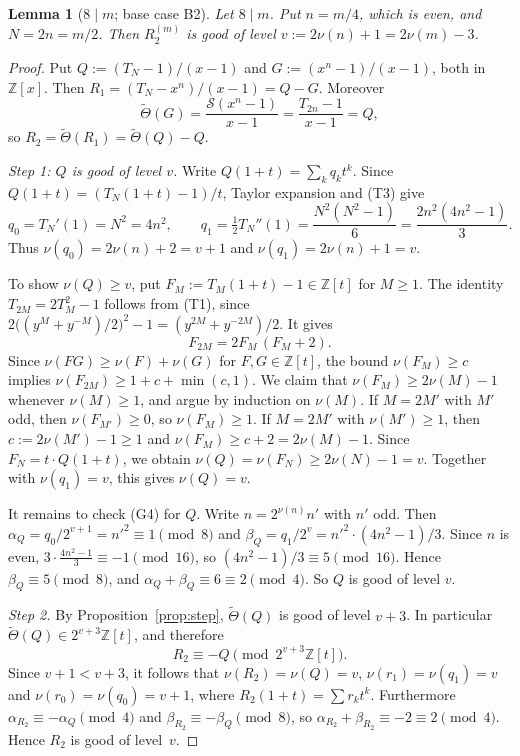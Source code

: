 \documentclass[11pt]{amsart}
\newtheorem{lemma}[theorem]{Lemma}
\theoremstyle{definition}
\theoremstyle{remark}
\newcommand{\Z}{\mathbb{Z}}
\newcommand{\Sop}{\mathcal{S}}
\newcommand{\Th}{\widetilde{\Theta}}
\begin{document}
\begin{lemma}[$8\mid m$; base case B2]\label{lem:base8}
Let $8\mid m$. Put $n=m/4$, which is even, and $N=2n=m/2$. Then $R^{(m)}_2$ is good of level $v:=2\nu(n)+1=2\nu(m)-3$.
\end{lemma}
\begin{proof}
Put $Q:=(T_N-1)/(x-1)$ and $G:=(x^n-1)/(x-1)$, both in $\Z[x]$. Then $R_1=(T_N-x^n)/(x-1)=Q-G$. Moreover
\[
  \Th(G)=\frac{\Sop(x^n-1)}{x-1}=\frac{T_{2n}-1}{x-1}=Q,
\]
so $R_2=\Th(R_1)=\Th(Q)-Q$.

\emph{Step 1: $Q$ is good of level $v$.} Write $Q(1+t)=\sum_kq_kt^k$. Since $Q(1+t)=(T_N(1+t)-1)/t$, Taylor expansion and (T3) give
\[
  q_0=T_N'(1)=N^2=4n^2,\qquad q_1=\tfrac12T_N''(1)=\frac{N^2(N^2-1)}6=\frac{2n^2(4n^2-1)}3 .
\]
Thus $\nu(q_0)=2\nu(n)+2=v+1$ and $\nu(q_1)=2\nu(n)+1=v$.

To show $\nu(Q)\ge v$, put $F_M:=T_M(1+t)-1\in\Z[t]$ for $M\ge1$. The identity $T_{2M}=2T_M^2-1$ follows from (T1), since $2\big((y^M+y^{-M})/2\big)^2-1=(y^{2M}+y^{-2M})/2$. It gives
\[
  F_{2M}=2F_M\,(F_M+2).
\]
Since $\nu(FG)\ge\nu(F)+\nu(G)$ for $F,G\in\Z[t]$, the bound $\nu(F_M)\ge c$ implies $\nu(F_{2M})\ge 1+c+\min(c,1)$. We claim that $\nu(F_M)\ge2\nu(M)-1$ whenever $\nu(M)\ge1$, and argue by induction on $\nu(M)$. If $M=2M'$ with $M'$ odd, then $\nu(F_{M'})\ge0$, so $\nu(F_M)\ge1$. If $M=2M'$ with $\nu(M')\ge1$, then $c:=2\nu(M')-1\ge1$ and $\nu(F_M)\ge c+2=2\nu(M)-1$. Since $F_N=t\cdot Q(1+t)$, we obtain $\nu(Q)=\nu(F_N)\ge 2\nu(N)-1=v$. Together with $\nu(q_1)=v$, this gives $\nu(Q)=v$.

It remains to check (G4) for $Q$. Write $n=2^{\nu(n)}n'$ with $n'$ odd. Then $\alpha_Q=q_0/2^{v+1}=n'^2\equiv1\pmod 8$ and $\beta_Q=q_1/2^{v}=n'^2\cdot(4n^2-1)/3$. Since $n$ is even, $3\cdot\frac{4n^2-1}{3}\equiv-1\pmod{16}$, so $(4n^2-1)/3\equiv5\pmod{16}$. Hence $\beta_Q\equiv5\pmod8$, and $\alpha_Q+\beta_Q\equiv6\equiv2\pmod4$. So $Q$ is good of level $v$.

\emph{Step 2.} By Proposition~\ref{prop:step}, $\Th(Q)$ is good of level $v+3$. In particular $\Th(Q)\in2^{v+3}\Z[t]$, and therefore
\[
  R_2\equiv -Q\pmod{2^{v+3}\Z[t]} .
\]
Since $v+1<v+3$, it follows that $\nu(R_2)=\nu(Q)=v$, $\nu(r_1)=\nu(q_1)=v$ and $\nu(r_0)=\nu(q_0)=v+1$, where $R_2(1+t)=\sum r_kt^k$. Furthermore $\alpha_{R_2}\equiv-\alpha_Q\pmod4$ and $\beta_{R_2}\equiv-\beta_Q\pmod 8$, so $\alpha_{R_2}+\beta_{R_2}\equiv-2\equiv2\pmod4$. Hence $R_2$ is good of level~$v$.
\end{proof}
\end{document}
